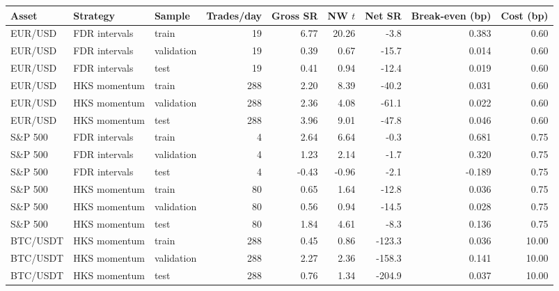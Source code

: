 \begin{tabular}{lllrrrrrr}
\toprule
Asset & Strategy & Sample & Trades/day & Gross SR & NW $t$ & Net SR & Break-even (bp) & Cost (bp) \\
\midrule
EUR/USD & FDR intervals & train & 19 & 6.77 & 20.26 & -3.8 & 0.383 & 0.60 \\
EUR/USD & FDR intervals & validation & 19 & 0.39 & 0.67 & -15.7 & 0.014 & 0.60 \\
EUR/USD & FDR intervals & test & 19 & 0.41 & 0.94 & -12.4 & 0.019 & 0.60 \\
EUR/USD & HKS momentum & train & 288 & 2.20 & 8.39 & -40.2 & 0.031 & 0.60 \\
EUR/USD & HKS momentum & validation & 288 & 2.36 & 4.08 & -61.1 & 0.022 & 0.60 \\
EUR/USD & HKS momentum & test & 288 & 3.96 & 9.01 & -47.8 & 0.046 & 0.60 \\
S\&P 500 & FDR intervals & train & 4 & 2.64 & 6.64 & -0.3 & 0.681 & 0.75 \\
S\&P 500 & FDR intervals & validation & 4 & 1.23 & 2.14 & -1.7 & 0.320 & 0.75 \\
S\&P 500 & FDR intervals & test & 4 & -0.43 & -0.96 & -2.1 & -0.189 & 0.75 \\
S\&P 500 & HKS momentum & train & 80 & 0.65 & 1.64 & -12.8 & 0.036 & 0.75 \\
S\&P 500 & HKS momentum & validation & 80 & 0.56 & 0.94 & -14.5 & 0.028 & 0.75 \\
S\&P 500 & HKS momentum & test & 80 & 1.84 & 4.61 & -8.3 & 0.136 & 0.75 \\
BTC/USDT & HKS momentum & train & 288 & 0.45 & 0.86 & -123.3 & 0.036 & 10.00 \\
BTC/USDT & HKS momentum & validation & 288 & 2.27 & 2.36 & -158.3 & 0.141 & 10.00 \\
BTC/USDT & HKS momentum & test & 288 & 0.76 & 1.34 & -204.9 & 0.037 & 10.00 \\
\bottomrule
\end{tabular}